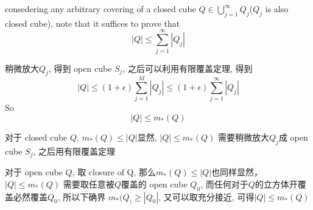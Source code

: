\documentclass[12pt, a4paper, oneside]{ctexart}
\begin{document}
consedering any arbitrary covering of a closed cube $Q\in \bigcup_{j=1}^{\infty}Q_j$($Q_j$ is also closed cube), note that it suffices to prove that$$|Q|\leq \sum_{j=1}^{\infty}|Q_j|$$

稍微放大$Q_j$, 得到 open cube $S_j$, 之后可以利用有限覆盖定理, 得到 $$|Q|\leq (1+\epsilon)\sum_{j=1}^{M}|Q_j| \leq (1+\epsilon)\sum_{j=1}^{\infty}|Q_j|$$ So $$|Q|\leq m_{*}(Q)$$

对于 closed cube $Q$, $m_{*}(Q)\leq|Q|$显然, $|Q|\leq m_{*}(Q)$ 需要稍微放大$Q_j$成 open cube $S_j$, 之后用有限覆盖定理

对于 open cube $Q$, 取 closure of Q, 那么$m_{*}(Q)\leq|Q|$也同样显然，$|Q|\leq m_{*}(Q)$ 需要取任意被$Q$覆盖的 open cube $Q_0$, 而任何对于$Q$的立方体开覆盖必然覆盖$Q_0$, 所以下确界 $m_*(Q_)\geq |Q_0|$, 又可以取充分接近, 可得$|Q|\leq m_{*}(Q)$
\end{document}
